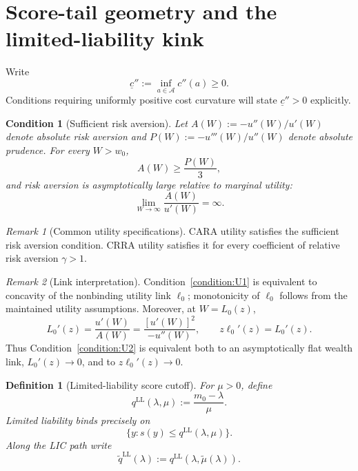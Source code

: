 \documentclass[11pt]{article}
\newtheorem{condition}{Condition}
\newtheorem{definition}{Definition}
\theoremstyle{remark}
\newtheorem{remark}{Remark}
\newcommand{\cA}{\mathcal A}
\begin{document}
\section{Score-tail geometry and the limited-liability kink}

Write
\[
 \underline c'':=\inf_{a\in\cA}c''(a)\ge0.
\]
Conditions requiring uniformly positive cost curvature will state
$\underline c''>0$ explicitly.

\begin{condition}[Sufficient risk aversion]
\label{condition:sufficient-risk-aversion}
Let $A(W):=-u''(W)/u'(W)$ denote absolute risk aversion and
$P(W):=-u'''(W)/u''(W)$ denote absolute prudence.  For every $W>w_0$,
\begin{equation}
 A(W)\ge\frac{P(W)}{3}, \tag{U1}\label{condition:U1}
\end{equation}
and risk aversion is asymptotically large relative to marginal utility:
\begin{equation}
 \lim_{W\to\infty}\frac{A(W)}{u'(W)}=\infty.
 \tag{U2}\label{condition:U2}
\end{equation}
\end{condition}

\begin{remark}[Common utility specifications]
CARA utility satisfies the sufficient risk aversion condition.  CRRA utility
satisfies it for every coefficient of relative risk aversion $\gamma>1$.
\end{remark}

\begin{remark}[Link interpretation]
Condition~\eqref{condition:U1} is equivalent to concavity of the nonbinding
utility link $\ell_0$; monotonicity of $\ell_0$ follows from the maintained
utility assumptions.  Moreover, at $W=L_0(z)$,
\[
 L_0'(z)
 =\frac{u'(W)}{A(W)}
 =\frac{[u'(W)]^2}{-u''(W)},
 \qquad
 z\ell_0'(z)=L_0'(z).
\]
Thus Condition~\eqref{condition:U2} is equivalent both to an asymptotically flat
wealth link, $L_0'(z)\to0$, and to $z\ell_0'(z)\to0$.
\end{remark}

\begin{definition}[Limited-liability score cutoff]
For $\mu>0$, define
\[
 q^{\mathrm{LL}}(\lambda,\mu):=\frac{m_0-\lambda}{\mu}.
\]
Limited liability binds precisely on
\[
 \{y:s(y)\le q^{\mathrm{LL}}(\lambda,\mu)\}.
\]
Along the LIC path write
\[
 \widetilde q^{\mathrm{LL}}(\lambda)
 :=q^{\mathrm{LL}}(\lambda,\widetilde\mu(\lambda)).
\]
\end{definition}
\end{document}
